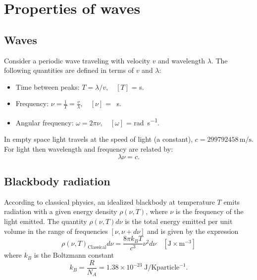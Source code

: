 

\section{Properties of waves}
\subsection{Waves}
Consider a periodic wave traveling with velocity $v$ and wavelength $\lambda$.
 The following quantities are defined in terms of $v$ and $\lambda$:
\begin{itemize}
\item Time between peaks: $T = \lambda / v, \quad [T]$ = \si{\second}.
\item Frequency: $\nu = \frac{1}{T}=\frac{v}{\lambda},  \quad [\nu]$ = \si{\per\second}.
\item Angular frequency: $\omega = 2\pi \nu,  \quad [\omega]$ = \si{\radian\per\second}.
\end{itemize}

In empty space light travels at the speed of light (a constant), $c = 299792458 \, \si{\meter\per\second}$.
For light then wavelength and frequency are related by:
\begin{equation}
\lambda \nu = c.
\end{equation}

\subsection{Blackbody radiation}
According to classical physics, an idealized blackbody at temperature $T$ emits radiation with a given energy density
$\rho(\nu,T)$, where $\nu$ is the frequency of the light emitted.
The quantity $\rho(\nu,T) d\nu$ is the total energy emitted per unit volume in the range of frequencies $[\nu,\nu + d\nu]$ and is given by the expression
\begin{equation}
\rho(\nu,T)_\mathrm{Classical} d\nu = \frac{8 \pi k_B T}{c^3} \nu^2 d\nu \quad [\si{\joule\times\meter^{-3}}]
\end{equation}
where $k_B$ is the Boltzmann constant
\begin{equation}
k_B = \frac{R}{N_A} = 1.38 \times 10^{-23}\;\si{\joule\per\kelvin} \text{particle}^{-1}.
\end{equation}


